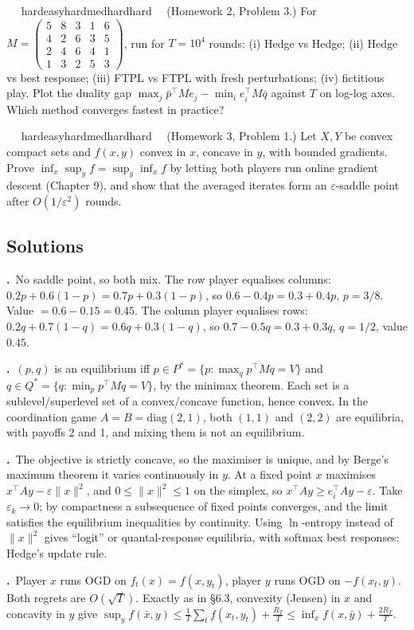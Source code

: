 \documentclass[11pt,a4paper,openany]{book}
\newcommand{\eps}{\varepsilon}
\newcommand{\norm}[1]{\lVert #1\rVert}
\newcommand{\extag}[2]{%
  \def\tmp{#1}\def\tmpE{easy}\def\tmpM{med}\def\tmpH{hard}%
  \ifx\tmp\tmpE\def\tagc{defc}\else\ifx\tmp\tmpM\def\tagc{thmc}\else\ifx\tmp\tmpH\def\tagc{warnc}\else\def\tagc{finc}\fi\fi\fi
  \tcbox[on line,boxrule=0pt,arc=2pt,colback=\tagc!12,left=2pt,right=2pt,top=0pt,bottom=0pt,boxsep=1pt]{\sffamily\scriptsize\bfseries\color{\tagc}#2}}
\newcommand{\exercise}[3]{\par\medskip\noindent\textbf{\sffamily #1}\ \ #2\ \ #3\par}
\newenvironment{solutions}{\small}{}
\newcommand{\sol}[2]{\par\smallskip\noindent\textbf{\sffamily #1.}\ #2\par}
\begin{document}
\exercise{6.4}{\extag{hard}{project}}{\hypertarget{sol-6.4}{}(Homework 2, Problem 3.) For $M=\begin{pmatrix}5&8&3&1&6\\4&2&6&3&5\\2&4&6&4&1\\1&3&2&5&3\end{pmatrix}$, run for $T=10^4$ rounds: (i) Hedge vs Hedge; (ii) Hedge vs best response; (iii) FTPL vs FTPL with fresh perturbations; (iv) fictitious play. Plot the duality gap $\max_j\bar p^\top Me_j-\min_ie_i^\top M\bar q$ against $T$ on log-log axes. Which method converges fastest in practice?}

\exercise{6.5}{\extag{hard}{challenge}}{\hypertarget{sol-6.5}{}(Homework 3, Problem 1.) Let $X,Y$ be convex compact sets and $f(x,y)$ convex in $x$, concave in $y$, with bounded gradients. Prove $\inf_x\sup_yf=\sup_y\inf_xf$ by letting both players run online gradient descent (Chapter 9), and show that the averaged iterates form an $\eps$-saddle point after $O(1/\eps^2)$ rounds.}

\subsection*{Solutions}
\begin{solutions}
\sol{6.1}{No saddle point, so both mix. The row player equalises columns: $0.2p+0.6(1-p)=0.7p+0.3(1-p)$, so $0.6-0.4p=0.3+0.4p$, $p=3/8$. Value $=0.6-0.15=0.45$. The column player equalises rows: $0.2q+0.7(1-q)=0.6q+0.3(1-q)$, so $0.7-0.5q=0.3+0.3q$, $q=1/2$, value $0.45$.}
\sol{6.2}{$(p,q)$ is an equilibrium iff $p\in P^*=\{p:\max_qp^\top Mq=V\}$ and $q\in Q^*=\{q:\min_pp^\top Mq=V\}$, by the minimax theorem. Each set is a sublevel/superlevel set of a convex/concave function, hence convex. In the coordination game $A=B=\mathrm{diag}(2,1)$, both $(1,1)$ and $(2,2)$ are equilibria, with payoffs 2 and 1, and mixing them is not an equilibrium.}
\sol{6.3}{The objective is strictly concave, so the maximiser is unique, and by Berge's maximum theorem it varies continuously in $y$. At a fixed point $x$ maximises $x^\top Ay-\eps\norm x^2$, and $0\le\norm{x}^2\le1$ on the simplex, so $x^\top Ay\ge e_i^\top Ay-\eps$. Take $\eps_k\to0$; by compactness a subsequence of fixed points converges, and the limit satisfies the equilibrium inequalities by continuity. Using $\ln$-entropy instead of $\norm x^2$ gives ``logit'' or quantal-response equilibria, with softmax best responses: Hedge's update rule.}
\sol{6.5}{Player $x$ runs OGD on $f_t(x)=f(x,y_t)$, player $y$ runs OGD on $-f(x_t,y)$. Both regrets are $O(\sqrt T)$. Exactly as in §6.3, convexity (Jensen) in $x$ and concavity in $y$ give $\sup_yf(\bar x,y)\le\frac1T\sum_tf(x_t,y_t)+\frac{R_T}T\le\inf_xf(x,\bar y)+\frac{2R_T}T$.}
\end{solutions}
\end{document}

